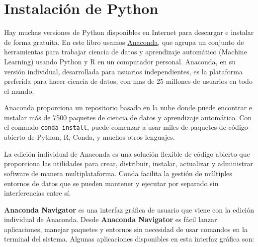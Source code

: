 \documentclass[
]{book}
\theoremstyle{definition}
\theoremstyle{definition}
\theoremstyle{definition}
\theoremstyle{definition}
\theoremstyle{remark}
\begin{document}
\hypertarget{instalaciuxf3n-de-python}{%
\section{Instalación de Python}\label{instalaciuxf3n-de-python}}

Hay muchas versiones de Python disponibles en Internet para descargar e instalar de forma gratuita. En este libro usamos \href{https://www.anaconda.com/products/individual}{Anaconda}, que agrupa un conjunto de herramientas para trabajar ciencia de datos y aprendizaje automático (Machine Learning) usando Python y R en un computador personal. Anaconda, en su versión individual, desarrollada para usuarios independientes, es la plataforma preferida para hacer ciencia de datos, con mas de 25 millones de usuarios en todo el mundo.

Anaconda proporciona un repositorio basado en la nube donde puede encontrar e instalar más de 7500 paquetes de ciencia de datos y aprendizaje automático. Con el comando \texttt{conda-install}, puede comenzar a usar miles de paquetes de código abierto de Python, R, Conda, y muchos otros lenguajes.

La edición individual de Anaconda es una solución flexible de código abierto que proporciona las utilidades para crear, distribuir, instalar, actualizar y administrar software de manera multiplataforma. Conda facilita la gestión de múltiples entornos de datos que se pueden mantener y ejecutar por separado sin interferencias entre sí.

\textbf{Anaconda Navigator} es una interfaz gráfica de usuario que viene con la edición individual de Anaconda. Desde \textbf{Anaconda Navigator} es fácil lanzar aplicaciones, manejar paquetes y entornos sin necesidad de usar comandos en la terminal del sistema. Algunas aplicaciones disponibles en esta interfaz gráfica son:
\end{document}
